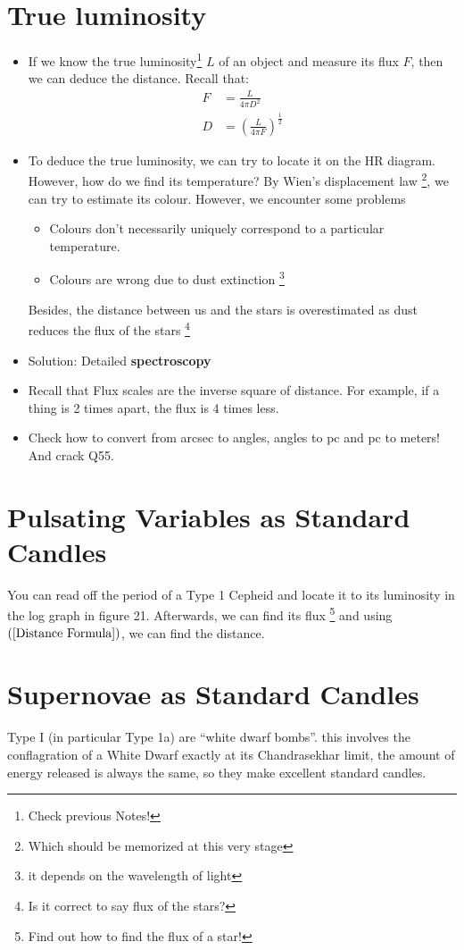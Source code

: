 \documentclass{article}
\begin{document}
\section{True luminosity}
 \begin{itemize}
 \item If we know the true luminosity\footnote{Check previous Notes!} $L$ of an object and measure its flux $F$, then we can deduce the distance. Recall that:
 \begin{align}
 F&=\frac{L}{4 \pi D^2} \\
 D&=\left(\frac{L}{4 \pi F} \right) ^{\frac{1}{2}}
 \label{Distance Formula}
 \end{align}
\item To deduce the true luminosity, we can try to locate it on the HR diagram. However, how do we find its temperature? By Wien's displacement law \footnote{ Which should be memorized at this very stage}, we can try to estimate its colour.
However, we encounter some problems
\begin{itemize}
\item Colours don't necessarily uniquely correspond to a particular temperature.
\item Colours are wrong due to dust extinction \footnote{it depends on the wavelength of light}
\end{itemize}
Besides, the distance between us and the stars is overestimated as dust reduces the flux of the stars \footnote{Is it correct to say flux of the stars?}
\item Solution: Detailed \textbf{spectroscopy}
\item Recall that Flux scales are the inverse square of distance. For example, if a thing is 2 times apart, the flux is 4 times less.
\item Check how to convert from arcsec to angles, angles to pc and pc to meters! And crack Q55.
\end{itemize}
\section{Pulsating Variables as Standard Candles}
You can read off the period of a Type 1 Cepheid and locate it to its luminosity in the log graph in figure 21. Afterwards, we can find its flux \footnote{Find out how to find the flux of a star!} and using $(\ref{Distance Formula})$, we can find the distance.
\section{Supernovae as Standard Candles}
Type I (in particular Type 1a) are “white dwarf bombs”.
this involves the conflagration of a White Dwarf exactly at its Chandrasekhar limit, the amount
of energy released is always the same, so they make excellent standard candles.
\end{document}
